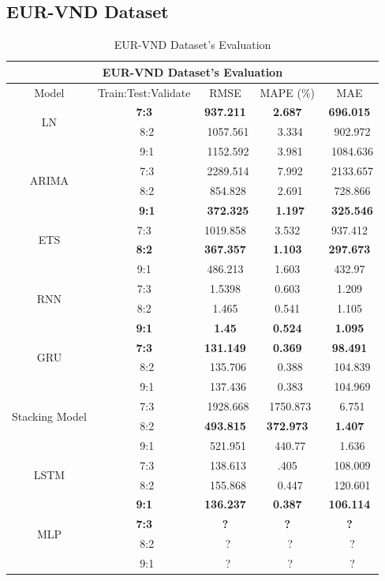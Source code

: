 \documentclass{ieeeojies}
\begin{document}
\subsection{EUR-VND Dataset} 
\begin{table}[H]
    \centering
    \begin{tabular}{|c|c|c|c|c|}
         \hline
         \multicolumn{5}{|c|}{\textbf{EUR-VND Dataset's Evaluation}}\\
         \hline
         \centering Model & Train:Test:Validate & RMSE & MAPE (\%) & MAE\\
         \hline
         \multirow{2}{*}{LN} &\textbf{7:3} &\textbf{937.211} &\textbf{2.687} &\textbf{696.015} \\ &\ 8:2 &\ 1057.561 &\ 3.334 &\ 902.972 \\&\ 9:1 &\ 1152.592 &\ 3.981 &\ 1084.636 \\
         \hline
         \multirow{2}{*}{ARIMA} &\ 7:3 &\ 2289.514 &\ 7.992 &\ 2133.657 \\ &\ 8:2 &\ 854.828 &\ 2.691 &\ 728.866 \\&\ \textbf{9:1} &\ \textbf{372.325} &\ \textbf{1.197} &\ \textbf{325.546} \\
         \hline
         \multirow{2}{*}{ETS} & 7:3 & 1019.858 & 3.532 & 937.412 \\ & \textbf{8:2} &\textbf{367.357}&\textbf{1.103} &\textbf{297.673} \\& 9:1 & 486.213 & 1.603 & 432.97 \\
         \hline
         \multirow{2}{*}{RNN} & 7:3 & 1.5398 & 0.603 & 1.209 \\ & 8:2 & 1.465 & 0.541 & 1.105 \\& \textbf{9:1} & \textbf{1.45} & \textbf{0.524} & \textbf{1.095} \\
         \hline
         \multirow{2}{*}{GRU} &\textbf{7:3} &\textbf{131.149}&\textbf{0.369}&\textbf{98.491} \\ &\ 8:2 &\ 135.706&\ 0.388 &\ 104.839 \\&\ 9:1 &\ 137.436 &\ 0.383 &\ 104.969 \\
         \hline
         \multirow{2}{*}{Stacking Model} &\ 7:3 &\ 1928.668 &\ 1750.873 &\ 6.751 \\ &\ 8:2 &\textbf{493.815} &\textbf{372.973} &\textbf{1.407}\\&\ 9:1 &\ 521.951 &\ 440.77 &\ 1.636 \\
         \hline
         \multirow{2}{*}{LSTM} &\ 7:3 &\ 138.613 &\0.405 &\ 108.009 \\ &\ 8:2 &\ 155.868&\ 0.447 &\ 120.601 \\&\textbf{9:1}&\textbf{136.237} &\textbf{0.387} &\textbf{106.114} \\
         \hline
         \multirow{2}{*}{MLP} &\textbf{7:3} &\textbf{?}&\textbf{?}&\textbf{?} \\ &\ 8:2 &\ ?&\ ? &\ ? \\&\ 9:1 &\ ? &\ ? &\ ? \\
         \hline
    \end{tabular}
    \caption{EUR-VND Dataset's Evaluation}
    \label{vcbresult}
\end{table}
\end{document}
